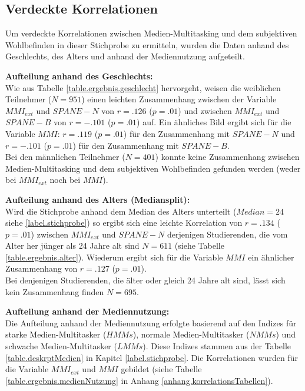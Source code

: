 \subsection{Verdeckte Korrelationen}
Um verdeckte Korrelationen zwischen Medien-Multitasking und dem subjektiven Wohlbefinden in dieser Stichprobe zu ermitteln, wurden die Daten anhand des Geschlechts, des Alters und anhand der Mediennutzung aufgeteilt. \par
\textbf{Aufteilung anhand des Geschlechts:} \\
Wie aus Tabelle \ref{table.ergebnis.geschlecht} hervorgeht, weisen die weiblichen Teilnehmer ($N=951$) einen leichten Zusammenhang zwischen der Variable $MMI_{ext}$ und $SPANE-N$ von $r=.126$ ($p=.01$) und zwischen  $MMI_{ext}$ und $SPANE-B$ von $r=-.101$ ($p=.01$) auf. Ein ähnliches Bild ergibt sich für die Variable $MMI$: $r=.119$ ($p=.01$) für den Zusammenhang mit $SPANE-N$ und $r=-.101$ ($p=.01$) für den Zusammenhang mit $SPANE-B$.\\
Bei den männlichen Teilnehmer ($N=401$) konnte keine Zusammenhang zwischen Medien-Multitasking und dem subjektiven Wohlbefinden gefunden werden (weder bei $MMI_{ext}$ noch bei $MMI$).\par
\textbf{Aufteilung anhand des Alters (Mediansplit):} \\
Wird die Stichprobe anhand dem Median des Alters unterteilt ($Median=24$ siehe \ref{label.stichprobe}) so ergibt sich eine leichte Korrelation von $r=.134$ ($p=.01$) zwischen $MMI_{ext}$ und $SPANE-N$ derjenigen Studierenden, die vom Alter her jünger als 24 Jahre alt sind $N=611$ (siehe Tabelle \ref{table.ergebnis.alter}). Wiederum ergibt sich für die Variable $MMI$ ein ähnlicher Zusammenhang von $r=.127$ ($p=.01$). \\
Bei denjenigen Studierenden, die älter oder gleich 24 Jahre alt sind, lässt sich kein Zusammenhang finden $N=695$.\par
\textbf{Aufteilung anhand der Mediennutzung:} \\
Die Aufteilung anhand der Mediennutzung erfolgte basierend auf den Indizes für starke Medien-Multitasker ($HMMs$), normale Medien-Multitasker ($NMMs$) und schwache Medien-Multitasker ($LMMs$). Diese Indizes stammen aus der Tabelle \ref{table.deskrptMedien} in Kapitel \ref{label.stichprobe}. Die Korrelationen wurden für die Variable $MMI_{ext}$ und $MMI$ gebildet (siehe Tabelle \ref{table.ergebnis.medienNutzung} in Anhang \ref{anhang.korrelationsTabellen}).\\
